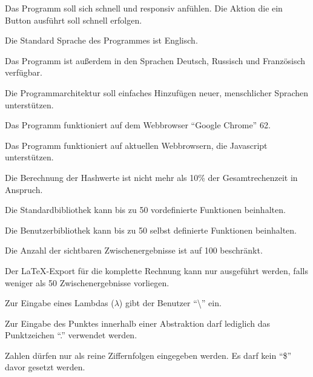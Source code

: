 \documentclass[parskip=full,11pt,twoside]{scrartcl}
\begin{document}
Das Programm soll sich schnell und responsiv anfühlen. Die Aktion die ein Button ausführt soll schnell erfolgen.

Die Standard Sprache des Programmes ist Englisch.

Das Programm ist außerdem in den Sprachen Deutsch, Russisch und Französisch verfügbar.

Die Programmarchitektur soll einfaches Hinzufügen neuer, menschlicher Sprachen unterstützen.

Das Programm funktioniert auf dem Webbrowser \enquote{Google Chrome} 62.

Das Programm funktioniert auf aktuellen Webbrowsern, die Javascript unterstützen.

Die Berechnung der Hashwerte ist nicht mehr als 10\% der Gesamtrechenzeit in Anspruch.

Die Standardbibliothek kann bis zu 50 vordefinierte Funktionen beinhalten.

Die Benutzerbibliothek kann bis zu 50 selbst definierte Funktionen beinhalten.

Die Anzahl der sichtbaren Zwischenergebnisse ist auf 100 beschränkt.

Der LaTeX-Export für die komplette Rechnung kann nur ausgeführt werden, falls weniger als 50 Zwischenergebnisse vorliegen.

Zur Eingabe eines Lambdas ($\lambda$) gibt der Benutzer \enquote {\textbackslash} ein.

Zur Eingabe des Punktes innerhalb einer Abstraktion darf lediglich das Punktzeichen \enquote {.} verwendet werden.

Zahlen dürfen nur als reine Ziffernfolgen eingegeben werden. Es darf kein \enquote {\$} davor gesetzt werden.
\end{document}
